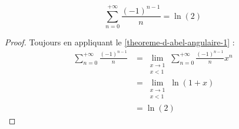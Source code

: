   \begin{application}
    \[ \sum_{n=0}^{+\infty} \frac{(-1)^{n-1}}{n} = \ln(2) \]
  \end{application}

  \begin{proof}
    Toujours en appliquant le \cref{theoreme-d-abel-angulaire-1} :
    \begin{align*}
      \sum_{n=0}^{+\infty} \frac{(-1)^{n-1}}{n} &= \lim_{\substack{x \rightarrow 1 \\ x < 1}} \sum_{n=0}^{+\infty} \frac{(-1)^{n-1}}{n} x^n \\
      &= \lim_{\substack{x \rightarrow 1 \\ x < 1}} \ln(1 + x) \\
      &= \ln(2)
    \end{align*}
  \end{proof}

